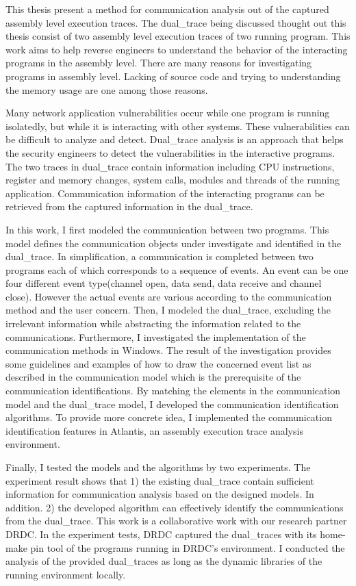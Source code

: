 \label{chapter:introduction}
This thesis present a method for communication analysis out of the captured assembly level execution traces. The dual\_trace being discussed thought out this thesis consist of two assembly level execution traces of two running program. This work aims to help reverse engineers to understand the behavior of the interacting programs in the assembly level. There are many reasons for investigating programs in assembly level. Lacking of source code and trying to understanding the memory usage are one among those reasons.

Many network application vulnerabilities occur while one program is running isolatedly, but while it is interacting with other systems. These vulnerabilities can be difficult to analyze and detect. Dual\_trace analysis is an approach that helps the security engineers to detect the vulnerabilities in the interactive programs. The two traces in dual\_trace contain information including CPU instructions, register and memory changes, system calls, modules and threads of the running application. Communication information of the interacting programs can be retrieved from the captured information in the dual\_trace. 

In this work, I first modeled the communication between two programs. This model defines the communication objects under investigate and identified in the dual\_trace. In simplification, a communication is completed between two programs each of which corresponds to a sequence of events. An event can be one four different event type(channel open, data send, data receive and channel close). However the actual events are various according to the communication method and the user concern. Then, I modeled the dual\_trace, excluding the irrelevant information while abstracting the information related to the communications. Furthermore, I investigated the implementation of the communication methods in Windows. The result of the investigation provides some guidelines and examples of how to draw the concerned event list as described in the communication model which is the prerequisite of the communication identifications. By matching the elements in the communication model and the dual\_trace model, I developed the communication identification algorithms. To provide more concrete idea, I implemented the communication identification features in Atlantis\cite{huang2017atlantis}, an assembly execution trace analysis environment.

Finally, I tested the models and the algorithms by two experiments. The experiment result shows that 1) the existing dual\_trace contain sufficient information for communication analysis based on the designed models. In addition. 2) the developed algorithm can effectively identify the communications from the dual\_trace. This work is a collaborative work with our research partner DRDC. In the experiment tests, DRDC captured the dual\_traces with its home-make pin tool of the programs running in DRDC's environment. I conducted the analysis of the provided dual\_traces as long as the dynamic libraries of the running environment locally.
